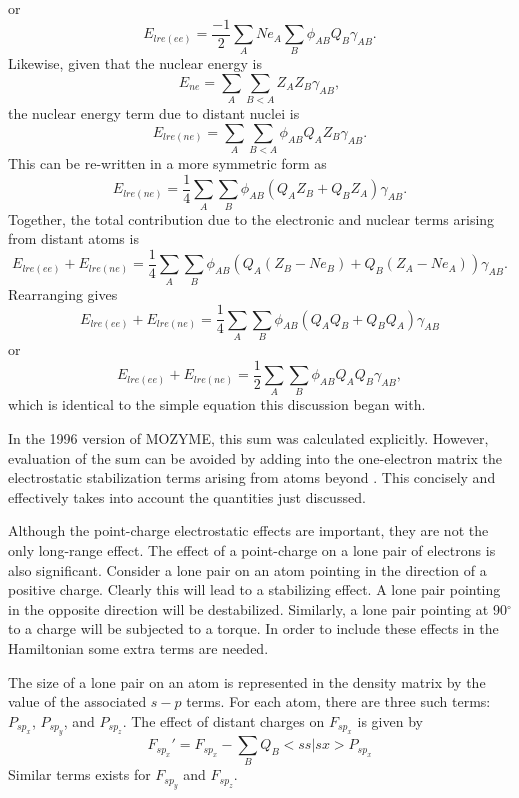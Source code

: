 or
\begin{equation}
E_{lre(ee)}=\frac{-1}{2}\sum_ANe_A\sum_B\phi_{AB}Q_B\gamma_{AB}.
\end{equation}
Likewise, given that the nuclear energy is 
\begin{equation}
E_{ne}=\sum_A\sum_{B<A} Z_AZ_B\gamma_{AB},
\end{equation}
the nuclear energy term due to distant nuclei is
\begin{equation}
E_{lre(ne)}=\sum_A\sum_{B<A}\phi_{AB} Q_AZ_B\gamma_{AB}.
\end{equation}
This can be re-written in a more symmetric form as
\begin{equation}
E_{lre(ne)}=\frac{1}{4}\sum_A\sum_{B}\phi_{AB}(Q_AZ_B +Q_BZ_A)\gamma_{AB}.
\end{equation}
Together, the total contribution due to the electronic and nuclear terms
arising from distant atoms is 
\begin{equation}
E_{lre(ee)}+E_{lre(ne)}= \frac{1}{4}\sum_A\sum_{B}\phi_{AB}(Q_A(Z_B-Ne_B)+Q_B(Z_A-Ne_A))\gamma_{AB}.
\end{equation}
Rearranging gives 
\begin{equation}
E_{lre(ee)}+E_{lre(ne)}= \frac{1}{4}\sum_A\sum_{B}\phi_{AB}(Q_AQ_B +Q_BQ_A)\gamma_{AB}
\end{equation}
or
\begin{equation}
E_{lre(ee)}+E_{lre(ne)}= \frac{1}{2}\sum_A\sum_{B}\phi_{AB}Q_AQ_B\gamma_{AB},
\end{equation}
which is identical to the simple equation this discussion began with.

In the 1996 version of MOZYME, this sum was calculated explicitly.  However, 
evaluation of the sum can be avoided by adding into the one-electron matrix
the  electrostatic stabilization terms arising from atoms beyond
.  This concisely and effectively takes into account the
quantities just discussed.

Although the point-charge electrostatic effects are important, they are not the
only long-range effect.  The effect of a point-charge on a lone pair of
electrons is also significant.  Consider a lone pair on an atom pointing in the
direction of a positive charge.  Clearly this will lead to a stabilizing
effect. A lone pair pointing in the opposite direction will be destabilized.
Similarly, a lone pair pointing at 90$^{\circ}$ to a charge will be subjected
to a torque.  In order to include these effects in the Hamiltonian some extra
terms are needed.

The size of a lone pair on an atom is represented in the density matrix by the
value of the associated  $s-p$ terms.  For each atom, there are three such
terms: $P_{sp_x}$, $P_{sp_y}$, and $P_{sp_z}$. The effect of  distant charges
on $F_{sp_x}$ is given by 
\begin{equation}
F_{sp_x}' = F_{sp_x}-\sum_{B}Q_B\! <\!ss|sx\!>\!P_{sp_x}
\end{equation}
Similar terms exists for $F_{sp_y}$  and $F_{sp_z}$.



